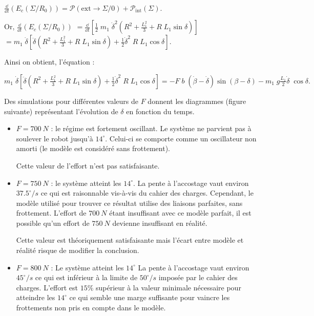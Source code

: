 \begin{multicols}{2}
\begin{corrige}
$
\frac{\dd }{\dd t}(E_c(\Sigma/R_0))=\mathcal{P}(\text{ext}\rightarrow \Sigma/0)+\mathcal{P}_\text{int}( \Sigma).
$

Or, $
\frac{\dd }{\dd t}(E_c(\Sigma/R_0))$ 
$=\frac{\dd }{\dd t}\left[\frac{1}{2}\;m_1\;\dot{\delta}^2\left(R^2+\frac{L_1^2}{3}+R\;L_1\sin\delta\right)\right]$
$=m_1\;\dot{\delta}\left[\ddot{\delta}\left(R^2+\frac{L_1^2}{3}+R\;L_1\sin\delta\right)+\frac{1}{2}\dot{\delta}^2\;R\;L_1\cos\delta\right]$.


Ainsi on obtient, l'équation :


$
\boxed{
m_1\;\dot{\delta}\left[\ddot{\delta}\left(R^2+\frac{L_1^2}{3}+R\;L_1\sin\delta\right)+\frac{1}{2}\dot{\delta}^2\;R\;L_1\cos\delta\right]
=-F\;b\;\left(\dot{\beta}-\dot{\delta}\right)\sin(\beta-\delta)-m_1\;g\frac{L_1}{2}\dot{\delta}\;\cos\delta.
}
$

\end{corrige}
\else
\fi


Des simulations pour différentes valeurs de $F$ donnent les diagrammes (figure suivante) représentant l'évolution de $\delta$ en fonction du temps.

\ifprof
\begin{corrige}
\begin{itemize}
\item \textbf{$F=\SI{700}{N}$} : le régime est fortement oscillant. Le système ne parvient pas à soulever
le robot jusqu'à $14^{\circ}$. Celui-ci se comporte comme un oscillateur non
amorti (le modèle est considéré sans frottement).

Cette valeur de l'effort n'est pas satisfaisante.

\item \textbf{$F=\SI{750}{N}$} : le système atteint les $14^{\circ}$. La pente à l'accostage vaut environ $37.5^{\circ}/s$
ce qui est raisonnable vis-à-vis du cahier des charges. Cependant, le
modèle utilisé pour trouver ce résultat utilise des liaisons parfaites,
sans frottement. L'effort de $\SI{700}{N}$ étant insuffisant avec ce modèle
parfait, il est possible qu'un effort de $\SI{750}{N}$ devienne insuffisant en
réalité.

Cette valeur est théoriquement satisfaisante mais l'écart entre modèle
et réalité risque de modifier la conclusion.

\item \textbf{$F=\SI{800}{N}$} : Le système atteint les $14^{\circ}$ La pente à l'accostage vaut environ $45^{\circ}/s$ ce
qui est inférieur à la limite de $50^{\circ}/s$ imposée par le cahier des
charges. L'effort est $15\%$ supérieur à la valeur minimale nécessaire
pour atteindre les $14^{\circ}$ ce qui semble une marge suffisante pour vaincre
les frottements non pris en compte dans le modèle.


\end{itemize}
\end{corrige}
\end{multicols}
